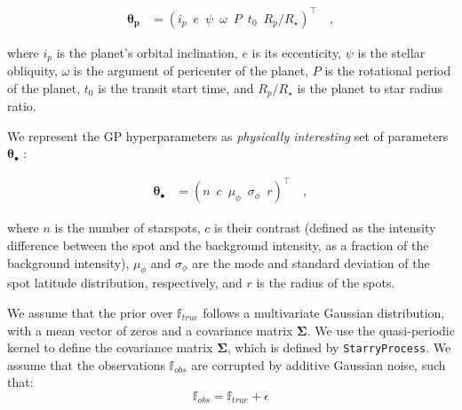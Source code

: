 \documentclass[twocolumn]{aastex631}
\begin{document}
\begin{linenomath}\begin{align}
    \label{eq:thetap}
    \pmb{\theta_p}
     & =
    \left(
    i_p
    \,\,\,
    e
    \,\,\,
    \psi
    \,\,\,
    \omega
    \,\,\,
    P
    \,\,\,
    t_0
    \,\,\,
    R_p/R_\star
    \right)^\top
    \quad,
\end{align}\end{linenomath}
where $i_p$ is the planet's orbital inclination, $e$ is its eccenticity, $\psi$ is the stellar obliquity, $\omega$ is the argument of pericenter of the planet,
$P$ is the rotational period of the planet, $t_0$ is the transit start time, and $R_p/R_\star$ is the planet to star radius ratio.

We represent the GP hyperparameters as \emph{physically interesting} set of parameters $\pmb{\theta}_\bullet$ \citep{Luger2021b}:
%
\begin{linenomath}\begin{align}
        \label{eq:thetaspot}
        \pmb{\theta}_\bullet
         & =
        \left(
        n
        \,\,\,
        c
        \,\,\,
        \mu_\phi
        \,\,\,
        \sigma_\phi
        \,\,\,
        r
        \right)^\top
        \quad,
    \end{align}\end{linenomath}
%
where $n$ is the number of starspots, $c$ is their contrast (defined as the intensity difference between the spot and the 
background intensity, as a fraction of the background intensity),
$\mu_\phi$ and $\sigma_\phi$ are the mode and standard deviation
of the spot latitude distribution, respectively, and $r$ is the radius
of the spots.

We assume that the prior over $\mathbb{f}_{true}$ follows a multivariate Gaussian distribution, with a mean vector of zeros and a covariance 
matrix $\pmb{\Sigma}$. We use the quasi-periodic kernel to define the covariance matrix $\pmb{\Sigma}$, which is defined by \texttt{StarryProcess}.
We assume that the observations $\mathbb{f}_{obs}$ are corrupted by additive Gaussian noise, such that:
\begin{equation}
    \mathbb{f}_{obs} = \mathbb{f}_{true} + \epsilon
\end{equation}
\end{document}
